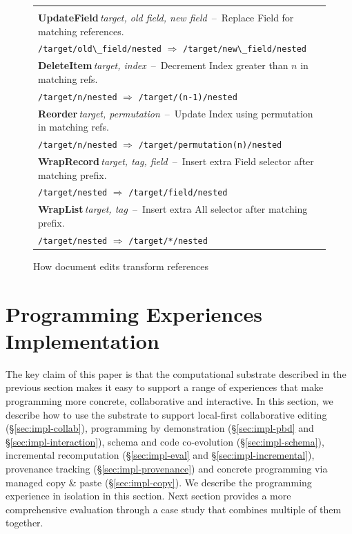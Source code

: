 \documentclass[sigconf]{acmart}
\begin{document}
\begin{figure}
\newcommand{\tttablecol}[5]{
\small{\bfseries #1}\;\,\footnotesize\textit{#2}\,\; --\,\; #5\\[-0.1em]
\quad \footnotesize #3 \;\;$\Rightarrow$\;\; #4 \\[0.3em]
}
\begin{tabular}{|l|}
\hline
\\[-1em]
\tttablecol{UpdateField}{target, old field, new field}{\Verb|/target/old\_field/nested|}{\Verb|/target/new\_field/nested|}
  {Replace Field for matching references.}
\tttablecol{DeleteItem}{target, index}{\Verb|/target/n/nested|}{\Verb|/target/(n-1)/nested|}
  {Decrement Index greater than $n$ in matching refs.}
\tttablecol{Reorder}{target, permutation}{\Verb|/target/n/nested|}{\Verb|/target/permutation(n)/nested|}
  {Update Index using permutation in matching refs.}
\tttablecol{WrapRecord}{target, tag, field}{\Verb|/target/nested|}{\Verb|/target/field/nested|}
  {Insert extra Field selector after matching prefix.}
\tttablecol{WrapList}{target, tag}{\Verb|/target/nested|}{\Verb|/target/*/nested|}
  {Insert extra All selector after matching prefix.}
\hline
\end{tabular}
\vspace{-0.5em}
\caption{How document edits transform references}
\label{fig:updates}
\vspace{-1em}
\end{figure}



\section{Programming Experiences Implementation}
\label{sec:impl}

The key claim of this paper is that the computational substrate described in the previous
section makes it easy to support a range of experiences that make programming more concrete,
collaborative and interactive. In this section, we describe how to use the substrate to support
local-first collaborative editing (\S\ref{sec:impl-collab}), programming by
demonstration (\S\ref{sec:impl-pbd} and \S\ref{sec:impl-interaction}),
schema and code co-evolution (\S\ref{sec:impl-schema}), incremental recomputation
(\S\ref{sec:impl-eval} and \S\ref{sec:impl-incremental}), provenance tracking (\S\ref{sec:impl-provenance})
and concrete programming via managed copy \& paste (\S\ref{sec:impl-copy}).
We describe the programming experience in isolation in this section. Next section provides a
more comprehensive evaluation through a case study that combines multiple of them together.
\end{document}
